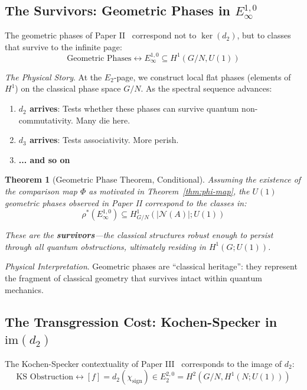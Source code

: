 \documentclass[11pt]{article}
\newtheorem{theorem}{Theorem}[section]
\begin{document}
\subsection{The Survivors: Geometric Phases in $E_\infty^{1,0}$}
\label{geometric-phases}

The geometric phases of Paper II~\cite{PaperII} correspond not to $\ker(d_2)$, but to classes that survive to the infinite page:
\[
\text{Geometric Phases} \longleftrightarrow E_\infty^{1,0} \subseteq H^1(G/N, U(1))
\]

\textit{The Physical Story}.
At the $E_2$-page, we construct local flat phases (elements of $H^1$) on the classical phase space $G/N$. As the spectral sequence advances:

\begin{enumerate}
\item \textbf{$d_2$ arrives}: Tests whether these phases can survive quantum non-commutativity. Many die here.
\item \textbf{$d_3$ arrives}: Tests associativity. More perish.
\item \textbf{... and so on}
\end{enumerate}

\begin{theorem}[Geometric Phase Theorem, Conditional]\label{thm:geometric}
Assuming the existence of the comparison map $\Phi$ as motivated in Theorem~\ref{thm:phi-map}, the $U(1)$ geometric phases observed in Paper II correspond to the classes in:
\[
\rho^*(E_\infty^{1,0}) \subseteq H^1_{G/N}(|\mathcal{N}(A)|; U(1))
\]

These are the \textbf{survivors}---the classical structures robust enough to persist through all quantum obstructions, ultimately residing in $H^1(G; U(1))$.
\end{theorem}

\textit{Physical Interpretation}.
Geometric phases are ``classical heritage'': they represent the fragment of classical geometry that survives intact within quantum mechanics.

\subsection{The Transgression Cost: Kochen-Specker in $\mathrm{im}(d_2)$}
\label{ks-transgression}

The Kochen-Specker contextuality of Paper III~\cite{PaperIII} corresponds to the image of $d_2$:
\[
\text{KS Obstruction} \longleftrightarrow [f] = d_2(\chi_{\text{sign}}) \in E_2^{2,0} = H^2(G/N, H^1(N; U(1)))
\]
\end{document}
